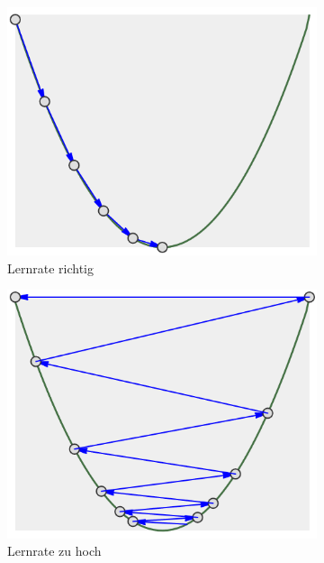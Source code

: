 \begin{figure}
    \centering
    \begin{subfigure}[b]{0.3\textwidth}
        \includegraphics[width=\textwidth]{images/lr_ok.png}
        \caption{Lernrate richtig}
        \label{fig:lr_ok}
    \end{subfigure}
    \begin{subfigure}[b]{0.3\textwidth}
        \includegraphics[width=\textwidth]{images/lr_too_high.png}
        \caption{Lernrate zu hoch}
        \label{fig:lr_too_high}
    \end{subfigure}
    \begin{subfigure}[b]{0.3\textwidth}

\end{subfigure}
\end{figure}
